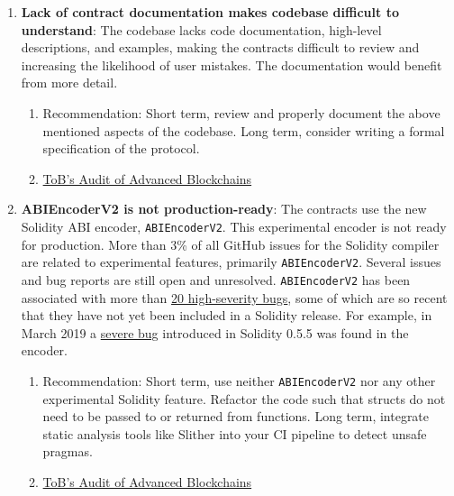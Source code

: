 \begin{enumerate}
\item\textbf{Lack of contract documentation makes codebase difficult to understand}: The codebase lacks code documentation, high-level descriptions, and examples, making the contracts difficult to review and increasing the likelihood of user mistakes. The documentation would benefit from more detail.
	\begin{enumerate}
	\item Recommendation: Short term, review and properly document the above mentioned aspects of the codebase. Long term, consider writing a formal specification of the protocol.
	\item\href{https://github.com/trailofbits/publications/blob/master/reviews/AdvancedBlockchain.pdf}{ToB's Audit of Advanced Blockchains}
	\end{enumerate}

\item\textbf{ABIEncoderV2 is not production-ready}: The contracts use the new Solidity ABI encoder, \verb|ABIEncoderV2|. This experimental encoder is not ready for production. More than 3\% of all GitHub issues for the Solidity compiler are related to experimental features, primarily \verb|ABIEncoderV2|. Several issues and bug reports are still open and unresolved. \verb|ABIEncoderV2| has been associated with more than \href{https://github.com/ethereum/solidity/issues?q=is:issue+abiencoderv2+label:%22bug+:bug:%22+sort:created-desc}{20 high-severity bugs}, some of which are so recent that they have not yet been included in a Solidity release. For example, in March 2019 a \href{https://blog.ethereum.org/2019/03/26/solidity-optimizer-and-abiencoderv2-bug/}{severe bug} introduced in Solidity 0.5.5 was found in the encoder.
	\begin{enumerate}
	\item Recommendation: Short term, use neither \verb|ABIEncoderV2| nor any other experimental Solidity feature. Refactor the code such that structs do not need to be passed to or returned from functions. Long term, integrate static analysis tools like Slither into your CI pipeline to detect unsafe pragmas.
	\item\href{https://github.com/trailofbits/publications/blob/master/reviews/AdvancedBlockchain.pdf}{ToB's Audit of Advanced Blockchains}
	\end{enumerate}


\end{enumerate}
